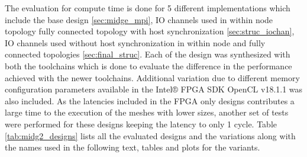 The evaluation for compute time is done for 5 different implementations which
include the base design \ref{sec:midge_mpi}, IO channels used in within node topology
fully connected topology with host synchronization \ref{sec:struc_iochan},
IO channels used without host synchronization in within node and fully
connected topologies \ref{sec:final_struc}. Each of the design was synthesized
with both the toolchains which is done to evaluate the difference in the performance
achieved with the newer toolchains. Additional variation due to different memory
configuration parameters available in the Intel® FPGA SDK OpenCL v18.1.1 was
also included. As the latencies included in the FPGA only designs contributes
a large time to the execution of the meshes with lower sizes, another set of
tests were performed for these designs keeping the latency to only 1 cycle.
Table \ref{tab:midg2_designs} lists all the evaluated designs and the variations
along with the names used in the following text, tables and plots for the variants.

